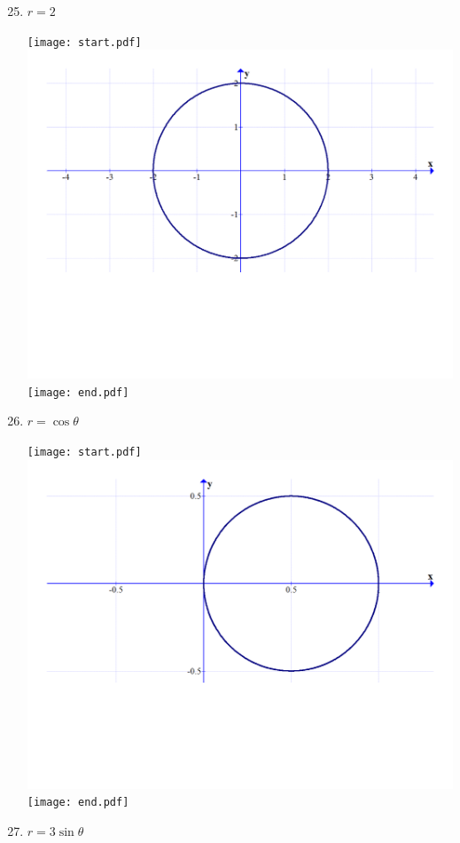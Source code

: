 \documentclass[12pt]{article}
\begin{document}
\begin{enumerate}
\setcounter{enumi}{24}

\item $r=2$ 

\texttt{[image: start.pdf]}
{{\includegraphics[scale=0.27]{sketch1}}}
\texttt{[image: end.pdf]}


\item $r=\cos{\theta}$ 

\texttt{[image: start.pdf]}
{{\includegraphics[scale=0.27]{sketch2.pdf}}}
\texttt{[image: end.pdf]}


\item $r=3\sin{\theta}$ 


\end{enumerate}
\end{document}
